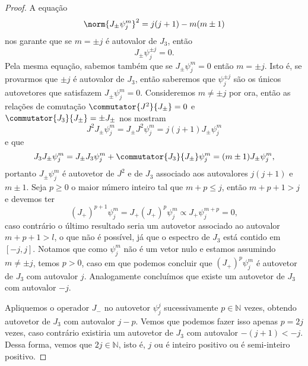 \begin{proof}
    A equação
    \begin{equation*}
        \norm{J_{\pm}\psi_{j}^m}^2 = j(j+1) - m(m \pm 1)
    \end{equation*}
    nos garante que se \(m = \pm j\) é autovalor de \(J_3\), então
    \begin{equation*}
        J_\pm \psi_j^{\pm j} = 0.
    \end{equation*}
    Pela mesma equação, sabemos também que se \(J_\pm\psi_{j}^{m} = 0\) então \(m = \pm j\). Isto é, se provarmos que \(\pm j\) é autovalor de \(J_3\), então saberemos que \(\psi_{j}^{\pm j}\) são os únicos autovetores que satisfazem \(J_\pm \psi_j^m = 0\). Consideremos \(m \neq \pm j\) por ora, então as relações de comutação \(\commutator{J^2}{J_\pm} = 0\) e \(\commutator{J_3}{J_\pm} = \pm  J_\pm\) nos mostram
    \begin{equation*}
    J^2 J_\pm\psi_{j}^{m} = J_\pm J^2\psi_j^m =  j(j+1) J_\pm \psi_{j}^{m}
    \end{equation*}
    e que
    \begin{equation*}
        J_3 J_\pm \psi_{j}^m = J_\pm J_3 \psi_j^m + \commutator{J_3}{J_\pm}\psi_j^m = (m \pm 1) J_\pm\psi_j^m,
    \end{equation*}
    portanto \(J_\pm \psi_j^m\) é autovetor de \(J^2\) e de \(J_3\) associado aos autovalores \(j(j+1)\) e \(m\pm 1\). Seja \(p \geq 0\) o maior número inteiro tal que \(m + p \leq j\), então \(m + p + 1 > j\) e  devemos ter
    \begin{equation*}
        (J_+)^{p+1} \psi_{j}^{m} = J_+ (J_+)^p\psi_{j}^{m} \propto J_+ \psi_{j}^{m+p} = 0,
    \end{equation*}
    caso contrário o último resultado seria um autovetor associado ao autovalor \(m + p + 1 > l\), o que não é possível, já que o espectro de \(J_3\) está contido em \([-j,j]\). Notamos que como \(\psi_{j}^{m}\) não é um vetor nulo e estamos assumindo \(m \neq \pm j\), temos \(p > 0\), caso em que podemos concluir que \((J_+)^p\psi_{j}^{m}\) é autovetor de \(J_3\) com autovalor \(j\). Analogamente concluímos que existe um autovetor de \(J_3\) com autovalor \(-j\).

    Apliquemos o operador \(J_-\) no autovetor \(\psi_{j}^j\) sucessivamente \(p \in \mathbb{N}\) vezes, obtendo autovetor de \(J_3\) com autovalor \(j - p\). Vemos que podemos fazer isso apenas \(p = 2j\) vezes, caso contrário existiria um autovetor de \(J_3\) com autovalor \(-(j+1) < -j\). Dessa forma, vemos que \(2j \in \mathbb{N}\), isto é, \(j\) ou é inteiro positivo ou é semi-inteiro positivo.
\end{proof}

